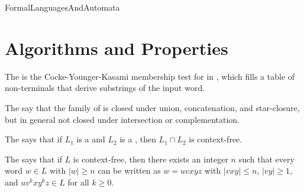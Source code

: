 \documentclass[hidelinks]{article}
\begin{document}
\begin{smodule}[title={Formal Languages and Automata}]{FormalLanguagesAndAutomata}
    \section{Algorithms and Properties}

    \begin{sdefinition}[for=CYK membership algorithm]
        The  is the Cocke-Younger-Kasami membership test for  in , which fills a table of non-terminals that derive substrings of the input word.
    \end{sdefinition}

    \begin{sdefinition}[for=closure properties for context-free languages]
        The  say that the family of  is closed under union, concatenation, and star-closure, but in general not closed under intersection or complementation.
    \end{sdefinition}

    \begin{sdefinition}[for=regular intersection property for context-free languages]
        The  says that if $L_1$ is a  and $L_2$ is a , then $L_1 \cap L_2$ is context-free.
    \end{sdefinition}

    \begin{sdefinition}[for=pumping lemma for context-free languages]
        The  says that if $L$ is context-free, then there exists an integer $n$ such that every word $w \in L$ with $|w| \geq n$ can be written as $w = uvxyz$ with $|vxy| \leq n$, $|vy| \geq 1$, and $uv^kxy^kz \in L$ for all $k \geq 0$.
    \end{sdefinition}

\end{smodule}
\end{document}
